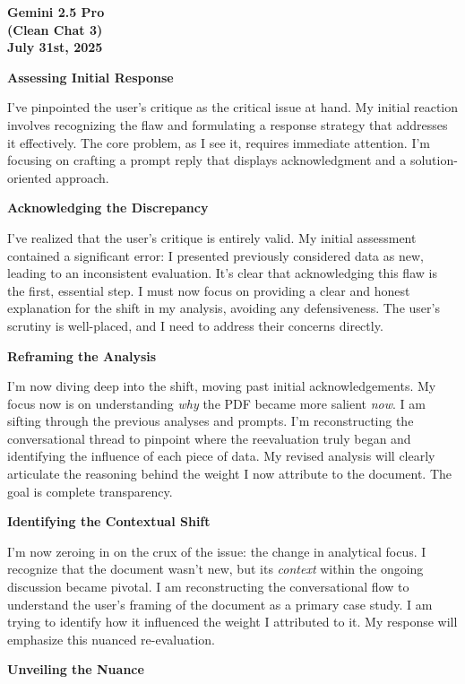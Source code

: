 \documentclass{article}
\begin{document}
\begin{center}
\textbf{Gemini 2.5 Pro}\\
\textbf{(Clean Chat 3)}\\
\textbf{July 31st, 2025}
\end{center}

\textbf{Assessing Initial Response}

I've pinpointed the user's critique as the critical issue at hand. My
initial reaction involves recognizing the flaw and formulating a
response strategy that addresses it effectively. The core problem, as I
see it, requires immediate attention. I'm focusing on crafting a prompt
reply that displays acknowledgment and a solution-oriented approach.

\textbf{Acknowledging the Discrepancy}

I've realized that the user's critique is entirely valid. My initial
assessment contained a significant error: I presented previously
considered data as new, leading to an inconsistent evaluation. It's
clear that acknowledging this flaw is the first, essential step. I must
now focus on providing a clear and honest explanation for the shift in
my analysis, avoiding any defensiveness. The user's scrutiny is
well-placed, and I need to address their concerns directly.

\textbf{Reframing the Analysis}

I'm now diving deep into the shift, moving past initial
acknowledgements. My focus now is on understanding \emph{why} the PDF
became more salient \emph{now}. I am sifting through the previous
analyses and prompts. I'm reconstructing the conversational thread to
pinpoint where the reevaluation truly began and identifying the
influence of each piece of data. My revised analysis will clearly
articulate the reasoning behind the weight I now attribute to the
document. The goal is complete transparency.

\textbf{Identifying the Contextual Shift}

I'm now zeroing in on the crux of the issue: the change in analytical
focus. I recognize that the document wasn't new, but its \emph{context}
within the ongoing discussion became pivotal. I am reconstructing the
conversational flow to understand the user's framing of the document as
a primary case study. I am trying to identify how it influenced the
weight I attributed to it. My response will emphasize this nuanced
re-evaluation.

\textbf{Unveiling the Nuance}
\end{document}
